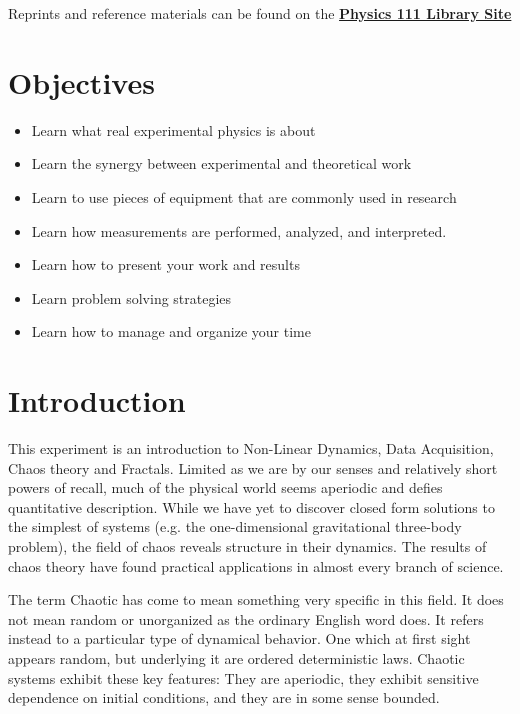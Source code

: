 \documentclass{../lab}
\begin{document}
Reprints and reference materials can be found on the \href{http://physics111.lib.berkeley.edu/Physics111/Reprints/NLD/NLD\_index.html}{\textbf{Physics 111 Library Site}}

\section{Objectives}

\begin{itemize}
    \item Learn what real experimental physics is about

    \item Learn the synergy between experimental and theoretical work

    \item Learn to use pieces of equipment that are commonly used in research

    \item Learn how measurements are performed, analyzed, and interpreted.

    \item Learn how to present your work and results

    \item Learn problem solving strategies

    \item Learn how to manage and organize your time
\end{itemize}

\section{Introduction}

This experiment is an introduction to Non-Linear Dynamics, Data Acquisition, Chaos theory and Fractals. Limited as we are by our senses and relatively short powers of recall, much of the physical world seems aperiodic and defies quantitative description. While we have yet to discover closed form solutions to the simplest of systems (e.g. the one-dimensional gravitational three-body problem), the field of chaos reveals structure in their dynamics. The results of chaos theory have found practical applications in almost every branch of science.

The term Chaotic has come to mean something very specific in this field. It does not mean random or unorganized as the ordinary English word does. It refers instead to a particular type of dynamical behavior. One which at first sight appears random, but underlying it are ordered deterministic laws. Chaotic systems exhibit these key features: They are aperiodic, they exhibit sensitive dependence on initial conditions, and they are in some sense bounded.
\end{document}
